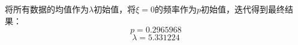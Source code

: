 \documentclass{ctexart}
\begin{document}
\begin{enumerate}
将所有数据的均值作为\(\lambda\)初始值，将\(\xi = 0\)的频率作为\(p\)初始值，迭代得到最终结果：
\[ p = 0.2965968 \]
 \[\lambda = 5.331224\]
















\end{enumerate}
\end{document}
